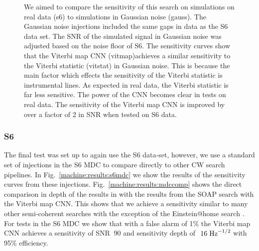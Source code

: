 \begin{figure}
	\caption[Gaussian noise results from SOAP and \gls{CNN} search.]{\label{machine:results:s6gauss} We aimed to compare the sensitivity of this search on simulations on real data (s6) to simulations in Gaussian noise (gauss). The Gaussian noise injections included the same gaps in data as the S6 data set. The \gls{SNR} of the simulated signal in Gaussian noise was adjusted based on the noise floor of S6. The sensitivity curves show that the Viterbi map \gls{CNN} (vitmap)achieves a similar sensitivity to the Viterbi statistic (vitstat) in Gaussian noise. This is because the main factor which effects the sensitivity of the Viterbi statistic is instrumental lines. As expected in real data, the Viterbi statistic is far less sensitive. The power of the \gls{CNN} becomes clear in tests on real data. The sensitivity of the Viterbi map \gls{CNN} is improved by over a factor of 2 in \gls{SNR} when tested on S6 data.}
	
\end{figure}

\subsubsection{S6}

The final test was set up to again use the S6 data-set, however, we use a standard set of injections in the S6 \gls{MDC} \cite{walsh2016ComparisonMethods} to compare directly to other \gls{CW} search pipelines. In Fig.~\ref{machine:results:s6mdc} we show the results of the sensitivity curves from these injections. Fig.~\ref{machine:results:mdccomp} shows the direct comparison in depth of the results in \cite{walsh2016ComparisonMethods} with the results from the SOAP search with the Viterbi map \gls{CNN}. This shows that we achieve a sensitivity similar to many other semi-coherent searches with the exception of the Einstein@home search \cite{abbott2016ResultsDeepest}. For tests in the S6 \gls{MDC} we show that with a false alarm of 1\% the Viterbi map \gls{CNN} achieves a sensitivity of SNR $~90$ and sensitivity depth of $~16\; {\rm Hz}^{-1/2}$ with 95\% efficiency.


